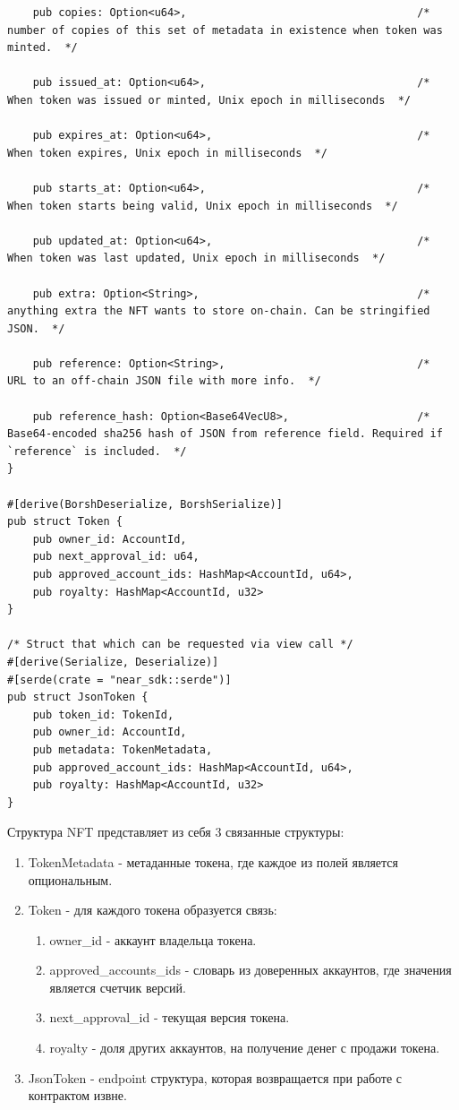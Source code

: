 \begin{verbatim}
    pub copies: Option<u64>,                                    /*  number of copies of this set of metadata in existence when token was minted.  */

    pub issued_at: Option<u64>,                                 /*  When token was issued or minted, Unix epoch in milliseconds  */

    pub expires_at: Option<u64>,                                /*  When token expires, Unix epoch in milliseconds  */

    pub starts_at: Option<u64>,                                 /*  When token starts being valid, Unix epoch in milliseconds  */

    pub updated_at: Option<u64>,                                /*  When token was last updated, Unix epoch in milliseconds  */

    pub extra: Option<String>,                                  /*  anything extra the NFT wants to store on-chain. Can be stringified JSON.  */

    pub reference: Option<String>,                              /*  URL to an off-chain JSON file with more info.  */

    pub reference_hash: Option<Base64VecU8>,                    /*  Base64-encoded sha256 hash of JSON from reference field. Required if `reference` is included.  */
}

#[derive(BorshDeserialize, BorshSerialize)]
pub struct Token {
    pub owner_id: AccountId,
    pub next_approval_id: u64,
    pub approved_account_ids: HashMap<AccountId, u64>,
    pub royalty: HashMap<AccountId, u32>
}

/* Struct that which can be requested via view call */
#[derive(Serialize, Deserialize)]
#[serde(crate = "near_sdk::serde")]
pub struct JsonToken {
    pub token_id: TokenId,
    pub owner_id: AccountId,
    pub metadata: TokenMetadata,
    pub approved_account_ids: HashMap<AccountId, u64>,
    pub royalty: HashMap<AccountId, u32>
}
\end{verbatim}

Структура NFT представляет из себя 3 связанные структуры:
\begin{enumerate}
    \item TokenMetadata - метаданные токена, где каждое из полей является опциональным.
    \item Token - для каждого токена образуется связь:
    \begin{enumerate}
        \item owner\_id - аккаунт владельца токена.
        \item approved\_accounts\_ids - словарь из доверенных аккаунтов, где значения является счетчик версий.
        \item next\_approval\_id - текущая версия токена.
        \item royalty - доля других аккаунтов, на получение денег с продажи токена.
    \end{enumerate}
    \item JsonToken - endpoint структура, которая возвращается при работе с контрактом извне.
\end{enumerate}


